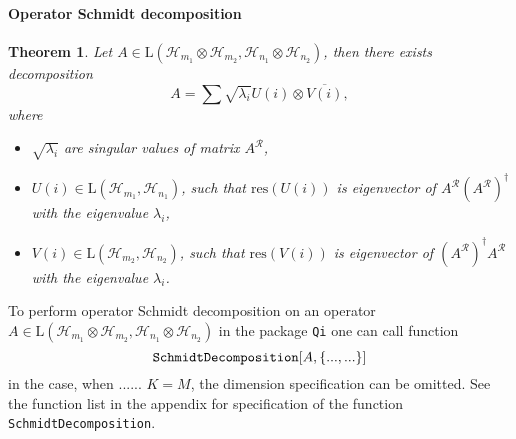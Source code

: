 \documentclass[11pt,a4paper]{article}
\newcommand{\qi}{\texttt{Qi}}
\newcommand{\res}{\mathrm{res}}
\newcommand{\reshuffle}[1]{{#1}^{\mathcal{R}}}
\newcommand{\ket}[1]{\ensuremath{|#1\rangle}}
\newcommand{\bra}[1]{\ensuremath{\langle#1|}}
\newcommand{\ketbra}[2]{\ensuremath{\ket{#1}\bra{#2}}}
\newcommand{\Hilb}[1]{\mathcal{H}_{#1}}
\newcommand{\Lin}{\mathrm{L}}
\newcommand{\1}{{\bf 1}}
\newcommand{\fname}[1]{\text{\texttt{#1}}}
\newtheorem{theorem}{Theorem}
\begin{document}
\paragraph{Operator Schmidt decomposition}
\begin{theorem} \label{th:Operator-Schmidt-Decomposition}
Let $A \in \Lin(\Hilb{m_1}\otimes \Hilb{m_2},\Hilb{n_1}\otimes \Hilb{n_2})$,
then there exists decomposition
\begin{equation}
 A = \sum \sqrt{\lambda_i} U(i) \otimes \overline{V(i)},
\end{equation}
where 
\begin{itemize}
    \item $\sqrt{\lambda_i}$ are singular values of matrix $\reshuffle{A}$,
    \item $U(i) \in \Lin(\Hilb{m_1}, \Hilb{n_1})$, such that $\res(U(i))$ is
    eigenvector of $\reshuffle{A} (\reshuffle{A})^{\dagger}$ with the eigenvalue
    $\lambda_i$,
    \item $V(i) \in \Lin(\Hilb{m_2}, \Hilb{n_2})$, such that $\res(V(i))$ is
    eigenvector of $(\reshuffle{A})^{\dagger} \reshuffle{A}$ with the eigenvalue
    $\lambda_i$.
\end{itemize}
\end{theorem}

To perform operator Schmidt decomposition on an operator $A \in
\Lin(\Hilb{m_1}\otimes \Hilb{m_2},\Hilb{n_1}\otimes \Hilb{n_2})$ in the package
\qi{} one can call function
\begin{equation}
\fname{SchmidtDecomposition}[ A, \{... , ... \}]
\end{equation} 
in the case, when ...... $K=M$, the dimension specification can be omitted. See
the function list in the appendix for specification of the function
\texttt{SchmidtDecomposition}.

\end{document}
